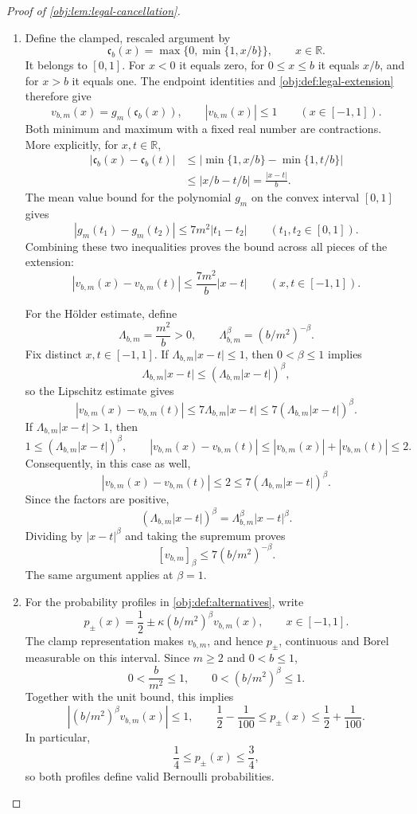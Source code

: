 \documentclass[11pt]{article}
\begin{document}
\begin{proof}[Proof of \cref{obj:lem:legal-cancellation}]
\begin{enumerate}
\item Define the clamped, rescaled argument by
\[
\mathfrak c_b(x)=\max\{0,\min\{1,x/b\}\},
\qquad x\in\mathbb R.
\]
It belongs to \([0,1]\). For \(x<0\) it equals zero, for \(0\le x\le b\) it equals \(x/b\), and for \(x>b\) it equals one. The endpoint identities and \cref{obj:def:legal-extension} therefore give
\[
v_{b,m}(x)=g_m(\mathfrak c_b(x)),
\qquad
|v_{b,m}(x)|\le1
\qquad(x\in[-1,1]).
\]
Both minimum and maximum with a fixed real number are contractions. More explicitly, for \(x,t\in\mathbb R\),
\[
\begin{aligned}
|\mathfrak c_b(x)-\mathfrak c_b(t)|
&\le|\min\{1,x/b\}-\min\{1,t/b\}|\\
&\le|x/b-t/b|
=\frac{|x-t|}{b}.
\end{aligned}
\]
The mean value bound for the polynomial \(g_m\) on the convex interval \([0,1]\) gives
\[
|g_m(t_1)-g_m(t_2)|
\le7m^2|t_1-t_2|
\qquad(t_1,t_2\in[0,1]).
\]
Combining these two inequalities proves the bound across all pieces of the extension:
\[
|v_{b,m}(x)-v_{b,m}(t)|
\le\frac{7m^2}{b}|x-t|
\qquad(x,t\in[-1,1]).
\]

For the Hölder estimate, define
\[
\Lambda_{b,m}=\frac{m^2}{b}>0,
\qquad
\Lambda_{b,m}^{\beta}=(b/m^2)^{-\beta}.
\]
Fix distinct \(x,t\in[-1,1]\). If \(\Lambda_{b,m}|x-t|\le1\), then \(0<\beta\le1\) implies
\[
\Lambda_{b,m}|x-t|
\le(\Lambda_{b,m}|x-t|)^\beta,
\]
so the Lipschitz estimate gives
\[
|v_{b,m}(x)-v_{b,m}(t)|
\le7\Lambda_{b,m}|x-t|
\le7(\Lambda_{b,m}|x-t|)^\beta.
\]
If \(\Lambda_{b,m}|x-t|>1\), then
\[
1\le(\Lambda_{b,m}|x-t|)^\beta,
\qquad
|v_{b,m}(x)-v_{b,m}(t)|
\le|v_{b,m}(x)|+|v_{b,m}(t)|\le2.
\]
Consequently, in this case as well,
\[
|v_{b,m}(x)-v_{b,m}(t)|
\le2\le7(\Lambda_{b,m}|x-t|)^\beta.
\]
Since the factors are positive,
\[
(\Lambda_{b,m}|x-t|)^\beta
=\Lambda_{b,m}^\beta|x-t|^\beta.
\]
Dividing by \(|x-t|^\beta\) and taking the supremum proves
\[
[v_{b,m}]_\beta\le7(b/m^2)^{-\beta}.
\]
The same argument applies at \(\beta=1\).

\item For the probability profiles in \cref{obj:def:alternatives}, write
\[
p_\pm(x)=\frac12\pm\kappa(b/m^2)^\beta v_{b,m}(x),
\qquad x\in[-1,1].
\]
The clamp representation makes \(v_{b,m}\), and hence \(p_\pm\), continuous and Borel measurable on this interval. Since \(m\ge2\) and \(0<b\le1\),
\[
0<\frac b{m^2}\le1,
\qquad
0<(b/m^2)^\beta\le1.
\]
Together with the unit bound, this implies
\[
|(b/m^2)^\beta v_{b,m}(x)|\le1,
\qquad
\frac12-\frac1{100}\le p_\pm(x)\le\frac12+\frac1{100}.
\]
In particular,
\[
\frac14\le p_\pm(x)\le\frac34,
\]
so both profiles define valid Bernoulli probabilities.


\end{enumerate}
\end{proof}
\end{document}
